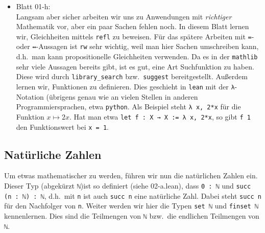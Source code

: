 \documentclass[11pt]{article}
\newcommand{\leanin}{\texttt}
\newcommand{\leanstate}{\texttt}
\begin{document}
\begin{itemize}
\item Blatt 01-h: \\ %
  Langsam aber sicher arbeiten wir uns zu Anwendungen mit \emph{richtiger} Mathematik vor, aber ein paar Sachen fehlen noch. In diesem Blatt lernen wir, Gleichheiten mittels \leanin{refl} zu beweisen. Für das spätere Arbeiten mit \leanstate{=}- oder \leanstate{↔}-Aussagen ist \leanin{rw} sehr wichtig, weil man hier Sachen umschreiben kann, d.h.\ man kann propositionelle Gleichheiten verwenden. Da es in der \leanstate{mathlib} sehr viele Aussagen bereits gibt, ist es gut, eine Art Suchfunktion zu haben. Diese wird durch \leanin{library_search} bzw.\ \leanin{suggest} bereitgestellt. Außerdem lernen wir, Funktionen zu definieren. Dies geschieht in \leanstate{lean} mit der \leanstate{λ}-Notation (übrigens genau wie an vielen Stellen in anderen Programmiersprachen, etwa \leanstate{python}. Als Beispiel steht \leanin{λ x, 2*x} für die Funktion $x \mapsto 2x$. Hat man etwa \leanin{let f : X → X := λ x, 2*x}, so gibt \leanstate{f 1} den Funktionswert bei \leanstate{x = 1}.
\end{itemize}

\subsection{Natürliche Zahlen}
Um etwas mathematischer zu werden, führen wir nun die natürlichen Zahlen ein. Dieser Typ (abgekürzt \leanstate{ℕ})ist so definiert (siehe 02-a.lean), dass \leanstate{0 : ℕ} und \leanstate{succ (n : ℕ) : ℕ}, d.h.\ mit \leanstate{n} ist auch \leanstate{succ n} eine natürliche Zahl. Dabei steht \leanstate{succ n} für den Nachfolger von \leanstate{n}. Weiter werden wir hier die Typen \leanstate{set ℕ} und \leanstate{finset ℕ} kennenlernen. Dies sind die Teilmengen von \leanstate{ℕ} bzw.\ die endlichen Teilmengen von \leanstate{ℕ}.
\end{document}
